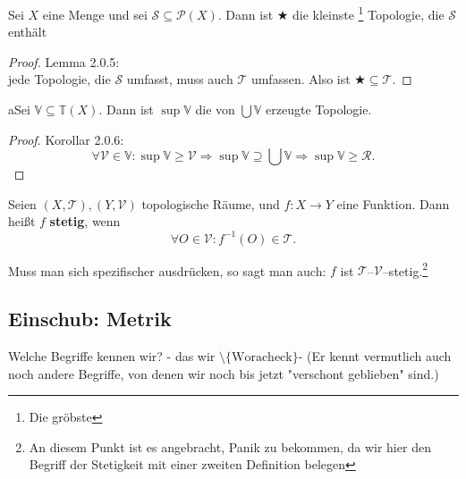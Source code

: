 {
Sei $X$ eine Menge und sei $\mathcal{S} \subseteq \mathcal{P}(X)$. 
Dann ist $\bigstar$ die kleinste \footnote{Die gröbste} Topologie, die $\mathcal{S}$ enthält
}
\begin{proof}{Lemma 2.0.5: }\\
  jede Topologie, die $\mathcal{S}$ umfasst, muss auch $\mathcal{T}$ umfassen.  
  Also ist $\bigstar \subseteq \mathcal{T}$.
\end{proof}


\begin{corollary}{}
  aSei $\mathbb{V} \subseteq \mathbb{T}(X)$.  
  Dann ist $\sup \mathbb{V}$ die von $\bigcup \mathbb{V}$ erzeugte Topologie.
\end{corollary}

\begin{proof}{Korollar 2.0.6:}\\
  \begin{equation*}
  \forall \mathcal{V} \in \mathbb{V} : 
  \sup \mathbb{V} \ge \mathcal{V}\Rightarrow
  \sup \mathbb{V} \supseteq \bigcup \mathbb{V}\Rightarrow
  \sup \mathbb{V}  \ge \mathcal{R}.
  \end{equation*}
\end{proof}

{
Seien $(X, \mathcal{T}), (Y, \mathcal{V})$ topologische Räume, und $f : X \to Y$ eine Funktion.  
Dann heißt $f$ \textbf{stetig}, wenn
\begin{equation*}
  \forall O \in \mathcal{V} : f^{-1}(O) \in \mathcal{T}.
\end{equation*}

Muss man sich spezifischer ausdrücken, so sagt man auch:  
$f$ ist $\mathcal{T}$–$\mathcal{V}$–stetig.\footnote{ An diesem Punkt ist es 
angebracht, Panik zu bekommen, da wir hier den Begriff der Stetigkeit mit einer zweiten
Definition belegen}

}
\subsection{Einschub: Metrik}

Welche Begriffe kennen wir? - das wir $\setminus\{\text{Woracheck}\}$-
(Er kennt vermutlich auch noch andere Begriffe, von denen wir noch bis jetzt 
"verschont geblieben" sind.)

